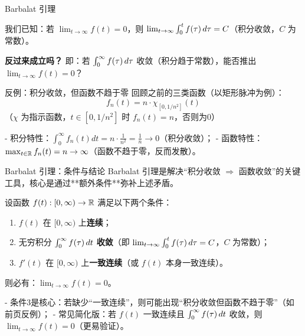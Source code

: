 \begin{frame}{Barbalat 引理}

  我们已知：若 $\lim_{t \to \infty} f(t) = 0$，则 $\lim_{t \to \infty} \int_{0}^{t} f(\tau) \, d\tau = C$（积分收敛，$C$ 为常数）。
  
  \vspace{0.5cm}
  \textbf{反过来成立吗？}  
  即：若 $\int_{0}^{\infty} f(\tau) \, d\tau$ 收敛（积分趋于常数），能否推出 $\lim_{t \to \infty} f(t) = 0$？

  \vspace{0.8cm}
  \begin{block}{反例：积分收敛，但函数不趋于零}
    回顾之前的三类函数（以矩形脉冲为例）：
    \[ f_n(t) = n \cdot \chi_{[0, 1/n^2]}(t) \]
    （$\chi$ 为指示函数，$t \in [0,1/n^2]$ 时 $f_n(t)=n$，否则为0）
    
    - 积分特性：$\int_0^\infty f_n(t)dt = n \cdot \frac{1}{n^2} = \frac{1}{n} \to 0$（积分收敛）；
    - 函数特性：$\max_{t \in \mathbb{R}} f_n(t) = n \to \infty$（函数不趋于零，反而发散）。
  \end{block}
\end{frame}

\begin{frame}{Barbalat 引理：条件与结论}
  Barbalat 引理是解决“积分收敛 $\Rightarrow$ 函数收敛”的关键工具，核心是通过**额外条件**弥补上述矛盾。

  \vspace{0.5cm}
  \begin{theorem}[经典 Barbalat 引理]
    设函数 $f(t): [0, \infty) \to \mathbb{R}$ 满足以下两个条件：
    \begin{enumerate}
      \item $f(t)$ 在 $[0, \infty)$ 上\textbf{连续}；
      \item 无穷积分 $\int_{0}^{\infty} f(\tau) \, dt$ \textbf{收敛}（即 $\lim_{t \to \infty} \int_{0}^{t} f(\tau) \, d\tau = C$，$C$ 为常数）；
      \item $f'(t)$ 在 $[0, \infty)$ 上\textbf{一致连续}（或 $f(t)$ 本身一致连续）。
    \end{enumerate}
    则必有：$\boxed{\lim_{t \to \infty} f(t) = 0}$。
  \end{theorem}

  \vspace{0.3cm}
  \begin{remark}
    - 条件3是核心：若缺少“一致连续”，则可能出现“积分收敛但函数不趋于零”（如前页反例）；
    - 常见简化版：若 $f(t)$ 一致连续且 $\int_{0}^{\infty} f(\tau) \, dt$ 收敛，则 $\lim_{t \to \infty} f(t) = 0$（更易验证）。
  \end{remark}
\end{frame}

